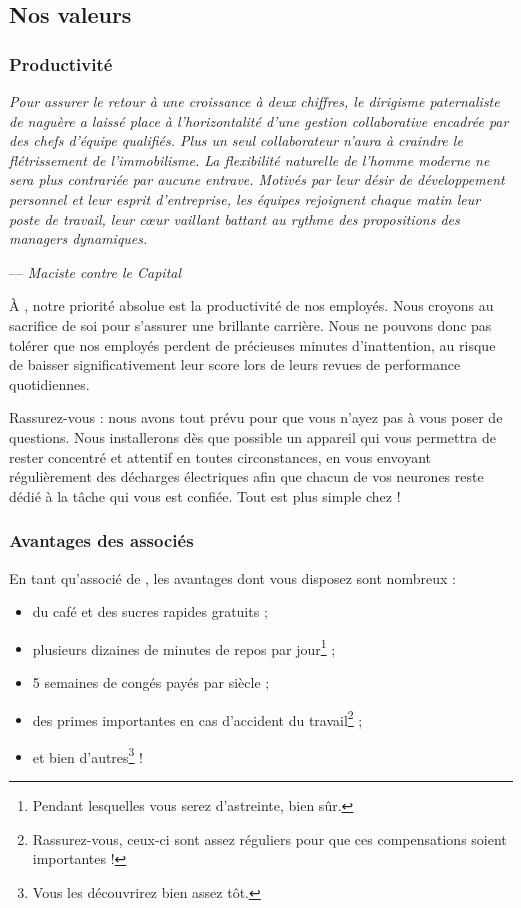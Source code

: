 \subsection{Nos valeurs}

\subsubsection{Productivité}

\emph{Pour assurer le retour à une croissance à deux chiffres, le dirigisme
paternaliste de naguère a laissé place à l'horizontalité d'une gestion
collaborative encadrée par des chefs d'équipe qualifiés. Plus un seul
collaborateur n'aura à craindre le flétrissement de l'immobilisme. La
flexibilité naturelle de l'homme moderne ne sera plus contrariée par aucune
entrave. Motivés par leur désir de développement personnel et leur esprit
d'entreprise, les équipes rejoignent chaque matin leur poste de travail, leur
cœur vaillant battant au rythme des propositions des managers dynamiques.}

\vspace{0.3cm}
\hspace{3cm} --- \emph{Maciste contre le Capital}

À \provogon{}, notre priorité absolue est la productivité de nos employés. Nous
croyons au sacrifice de soi pour s'assurer une brillante carrière. Nous ne
pouvons donc pas tolérer que nos employés perdent de précieuses minutes
d'inattention, au risque de baisser significativement leur score lors de leurs
revues de performance quotidiennes.

Rassurez-vous : nous avons tout prévu pour que vous n'ayez pas à vous poser de
questions. Nous installerons dès que possible un appareil qui vous permettra
de rester concentré et attentif en toutes circonstances, en vous envoyant
régulièrement des décharges électriques afin que chacun de vos neurones reste
dédié à la tâche qui vous est confiée. Tout est plus simple chez \provogon{} !

\subsubsection{Avantages des associés}

En tant qu'associé de \provogon{}, les avantages dont vous disposez sont
nombreux :

\begin{itemize}
    \item du café et des sucres rapides gratuits ;
    \item plusieurs dizaines de minutes de repos par jour\footnote{Pendant
        lesquelles vous serez d'astreinte, bien sûr.} ;
    \item 5 semaines de congés payés par siècle ;
    \item des primes importantes en cas d'accident du
        travail\footnote{Rassurez-vous, ceux-ci sont assez réguliers pour
        que ces compensations soient importantes !} ;
    \item et bien d'autres\footnote{Vous les découvrirez bien assez tôt.} !
\end{itemize}

